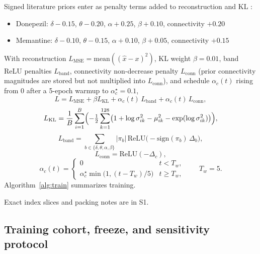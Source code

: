Signed literature priors enter as penalty terms added to reconstruction and KL \citep{Babiloni2006DonepezilEEG,Jeong2004EEGreview,Winblad2007Memantine,Rive2013Memantine}:
\begin{itemize}
  \item Donepezil: \(\delta-0.15\), \(\theta-0.20\), \(\alpha+0.25\), \(\beta+0.10\), connectivity \(+0.20\)
  \item Memantine: \(\delta-0.10\), \(\theta-0.15\), \(\alpha+0.10\), \(\beta+0.05\), connectivity \(+0.15\)
\end{itemize}
With reconstruction \(L_{\mathrm{MSE}}=\mathrm{mean}((\hat{x}-x)^2)\), KL weight \(\beta=0.01\), band ReLU penalties \(L_{\mathrm{band}}\), connectivity non-decrease penalty \(L_{\mathrm{conn}}\) (prior connectivity magnitudes are stored but not multiplied into \(L_{\mathrm{conn}}\)), and schedule \(\alpha_c(t)\) rising from 0 after a 5-epoch warmup to \(\alpha_c^{\star}=0.1\),
\begin{equation}
L = L_{\mathrm{MSE}} + \beta L_{\mathrm{KL}} + \alpha_c(t)\,L_{\mathrm{band}} + \alpha_c(t)\,L_{\mathrm{conn}},
\label{eq:total}
\end{equation}
\begin{equation}
L_{\mathrm{KL}} = \frac{1}{B}\sum_{i=1}^{B}\Bigl(-\tfrac{1}{2}\sum_{k=1}^{128}\bigl(1+\log\sigma^2_{ik}-\mu_{ik}^2-\exp(\log\sigma^2_{ik})\bigr)\Bigr),
\label{eq:kl}
\end{equation}
\begin{equation}
L_{\mathrm{band}} = \sum_{b\in\{\delta,\theta,\alpha,\beta\}}|\pi_b|\,\mathrm{ReLU}\bigl(-\mathrm{sign}(\pi_b)\,\Delta_b\bigr),
\label{eq:band}
\end{equation}
\begin{equation}
L_{\mathrm{conn}} = \mathrm{ReLU}(-\Delta_c),
\label{eq:conn}
\end{equation}
\begin{equation}
\alpha_c(t)=\begin{cases}
0 & t < T_w,\\
\alpha_c^{\star}\min\bigl(1,(t-T_w)/5\bigr) & t \ge T_w,
\end{cases}
\qquad T_w=5.
\label{eq:alpha}
\end{equation}
Algorithm~\ref{alg:train} summarizes training.

Exact index slices and packing notes are in S1.

\subsection{Training cohort, freeze, and sensitivity protocol}

